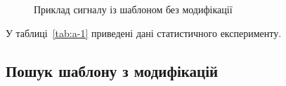 \begin{figure}[!h]
            \caption{Приклад сигналу із шаблоном без модифікації}\label{fig:a-3}
        \end{figure}
        У таблиці~\ref{tab:a-1} приведені дані статистичного експерименту.

    \subsection{Пошук шаблону з модифікацій}
